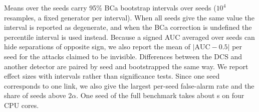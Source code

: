 Means over the \nSeeds{} seeds carry 95\% BCa bootstrap intervals over seeds \cite{efron1979} ($10^4$ resamples, a fixed generator per interval). When all seeds give the same value the interval is reported as degenerate, and when the BCa correction is undefined the percentile interval is used instead. Because a signed AUC averaged over seeds can hide separations of opposite sign, we also report the mean of $|\mathrm{AUC}-0.5|$ per seed for the attacks claimed to be invisible. Differences between the DCS and another detector are paired by seed and bootstrapped the same way. We report effect sizes with intervals rather than significance tests. Since one seed corresponds to one link, we also give the largest per-seed false-alarm rate and the share of seeds above $2\alpha$. One seed of the full benchmark takes about \runtime{} s on four CPU cores.
